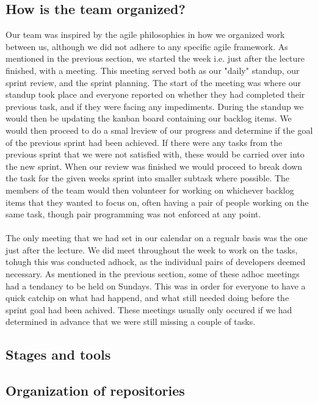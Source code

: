 \subsection{How is the team organized?}
Our team was inspired by the agile philosophies in how we organized work between us, although we did not adhere to any specific agile framework. As mentioned in the previous section, we started the week i.e. just after the lecture finished, with a meeting. This meeting served both as our "daily" standup, our sprint review, and the sprint planning. The start of the meeting was where our standup took place and everyone reported on whether they had completed their previous task, and if they were facing any impediments. During the standup we would then be updating the kanban board containing our backlog items. We would then proceed to do a smal lreview of our progress and determine if the goal of the previous sprint had been achieved. If there were any tasks from the previous sprint that we were not satisfied with, these would be carried over into the new sprint. When our review was finished we would proceed to break down the task for the given weeks sprint into smaller subtask where possible. The members of the team would then volunteer for working on whichever backlog items that they wanted to focus on, often having a pair of people working on the same task, though pair programming was not enforced at any point.
\\\\
The only meeting that we had set in our calendar on a regualr basis was the one just after the lecture. We did meet throughout the week to work on the tasks, tohugh this was conducted adhock, as the individual pairs of developers deemed necessary. As mentioned in the previous section, some of these adhoc meetings had a tendancy to be held on Sundays. This was in order for everyone to have a quick catchip on what had happend, and what still needed doing before the sprint goal had been achived. These meetings usually only occured if we had determined in advance that we were still missing a couple of tasks.
\subsection{Stages and tools}
\subsection{Organization of repositories}
